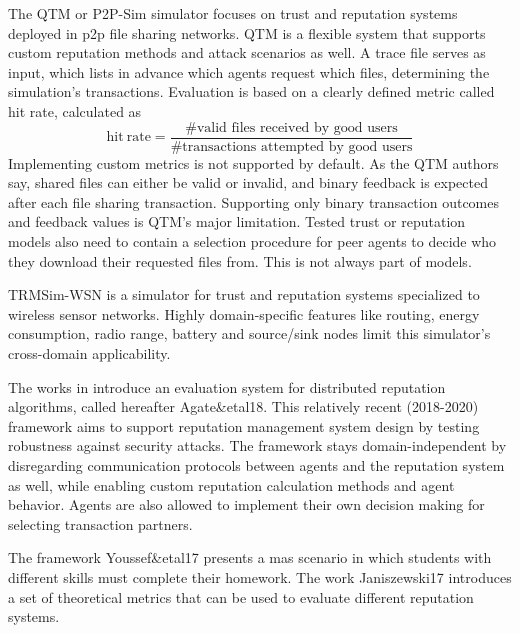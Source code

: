 \documentclass[%
    ]{\PathToTumTemplate/thesis/tum_thesis}
\begin{document}
The QTM or P2P-Sim simulator focuses on trust and reputation systems deployed in \gls{p2p} file sharing networks.
QTM is a flexible system that supports custom reputation methods and attack scenarios as well.
A trace file serves as input, which lists in advance which agents request which files, determining the simulation's transactions.
Evaluation is based on a clearly defined metric called hit rate, calculated as
\begin{equation}
\mathrm{hit~rate}=\frac{\text{\# valid files received by good users}}{\text{\# transactions attempted by good users}}
\end{equation}
Implementing custom metrics is not supported by default.
As the QTM authors say, shared files can either be valid or invalid, and binary feedback is expected after each file sharing transaction.
Supporting only binary transaction outcomes and feedback values is QTM's major limitation.
Tested trust or reputation models also need to contain a selection procedure for peer agents to decide who they download their requested files from.
This is not always part of models.

TRMSim-WSN is a simulator for trust and reputation systems specialized to wireless sensor networks.
Highly domain-specific features like routing, energy consumption, radio range, battery and source/sink nodes limit this simulator's cross-domain applicability.

The works in \cite{agate_platform_2018,agate_reputation_2020} introduce an evaluation system for distributed reputation algorithms, called hereafter Agate\&etal18.
This relatively recent (2018-2020) framework aims to support reputation management system design by testing robustness against security attacks.
The framework stays domain-independent by disregarding communication protocols between agents and the reputation system as well, while enabling custom reputation calculation methods and agent behavior.
Agents are also allowed to implement their own decision making for selecting transaction partners.

The framework Youssef\&etal17 presents a \gls{mas} scenario in which students with different skills must complete their homework\cite{youssef_towards_2017}.
The work Janiszewski17 introduces a set of theoretical metrics that can be used to evaluate different reputation systems\cite{janiszewski_towards_2017}.



\end{document}
